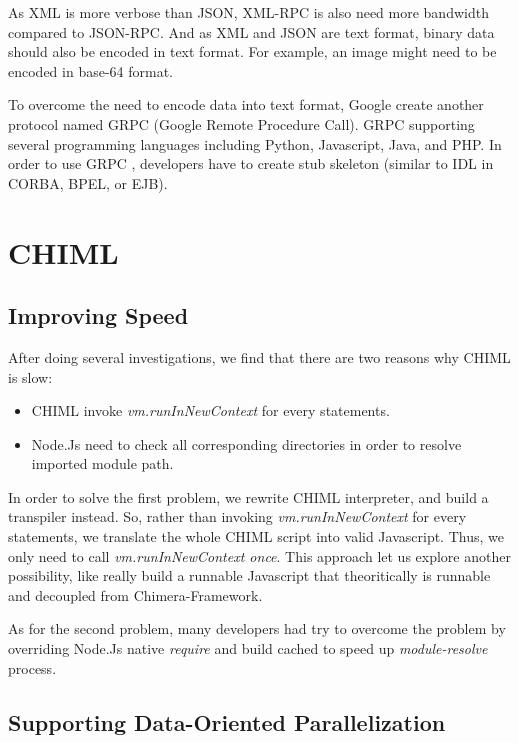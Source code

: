 \documentclass[conference]{IEEEtran}
\begin{document}
As XML is more verbose than JSON, XML-RPC is also need more bandwidth compared to JSON-RPC. And as XML and JSON are text format, binary data should also be encoded in text format. For example, an image might need to be encoded in base-64 format.

To overcome the need to encode data into text format, Google create another protocol named GRPC (Google Remote Procedure Call). GRPC supporting several programming languages including Python, Javascript, Java, and PHP. In order to use GRPC \cite{grpc}, developers have to create stub skeleton (similar to IDL in CORBA, BPEL, or EJB).

\section{CHIML}

\subsection{Improving Speed}

After doing several investigations, we find that there are two reasons why CHIML is slow:

\begin{itemize}
    \item CHIML invoke {\it vm.runInNewContext} for every statements.
    \item Node.Js need to check all corresponding directories in order to resolve imported module path.
\end{itemize}

In order to solve the first problem, we rewrite CHIML interpreter, and build a transpiler instead. So, rather than invoking {\it vm.runInNewContext} for every statements, we translate the whole CHIML script into valid Javascript. Thus, we only need to call {\it vm.runInNewContext once}. This approach let us explore another possibility, like really build a runnable Javascript that theoritically is runnable and decoupled from Chimera-Framework.

As for the second problem, many developers had try to overcome the problem by overriding Node.Js native {\it require} and build cached to speed up {\it module-resolve} process.

\subsection{Supporting Data-Oriented Parallelization}
\end{document}
